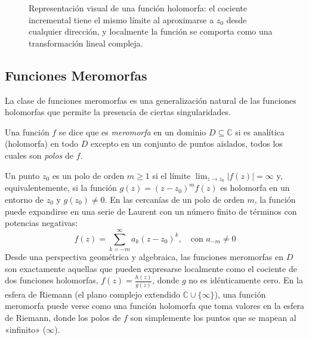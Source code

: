 \documentclass[a4paper]{article}
\begin{document}
\begin{figure}[H]
\caption{Representación visual de una función holomorfa: el cociente incremental tiene el mismo límite al aproximarse a $z_0$ desde cualquier dirección, y localmente la función se comporta como una transformación lineal compleja.}
\end{figure}

\subsection*{Funciones Meromorfas}
La clase de funciones meromorfas es una generalización natural de las funciones holomorfas que permite la presencia de ciertas singularidades. 

Una función $f$ se dice que es \textit{meromorfa} en un dominio $D \subseteq \mathbb{C}$ si es analítica (holomorfa) en todo $D$ excepto en un conjunto de puntos aislados, todos los cuales son \textit{polos} de $f$. 

Un punto $z_0$ es un polo de orden $m \geq 1$ si el límite $\lim_{z \to z_0} |f(z)| = \infty$ y, equivalentemente, si la función $g(z) = (z - z_0)^m f(z)$ es holomorfa en un entorno de $z_0$ y $g(z_0) \neq 0$. En las cercanías de un polo de orden $m$, la función puede expandirse en una serie de Laurent con un número finito de términos con potencias negativas:
$$ f(z) = \sum_{k=-m}^{\infty} a_k (z - z_0)^k, \quad \text{con } a_{-m} \neq 0 $$
Desde una perspectiva geométrica y algebraica, las funciones meromorfas en $D$ son exactamente aquellas que pueden expresarse localmente como el cociente de dos funciones holomorfas, $f(z) = \frac{h(z)}{g(z)}$, donde $g$ no es idénticamente cero. En la esfera de Riemann (el plano complejo extendido $\mathbb{C} \cup \{\infty\}$), una función meromorfa puede verse como una función holomorfa que toma valores en la esfera de Riemann, donde los polos de $f$ son simplemente los puntos que se mapean al «infinito» ($\infty$).
\end{document}
